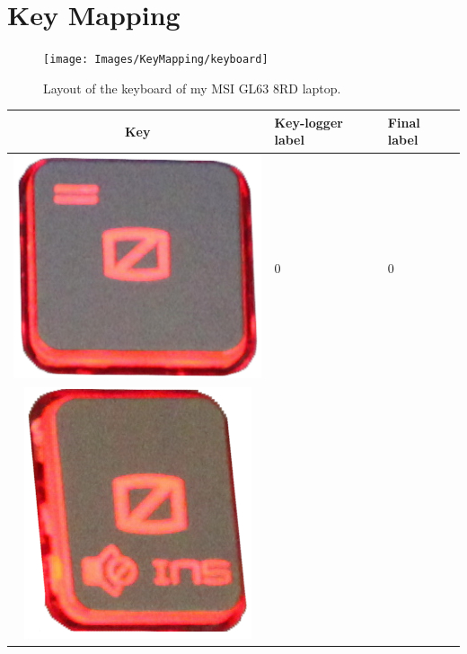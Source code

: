 \appendix
\chapter{Key Mapping}\label{appendix:KeyMapping}
\begin{figure}[h]
     \centering
     \texttt{[image: Images/KeyMapping/keyboard]}
     \caption{\footnotesize{Layout of the keyboard of my MSI GL63 8RD laptop.}}\label{keymapping:keyboard}
\end{figure}

\renewcommand{\arraystretch}{1.4}
\footnotesize
\vspace{0.5cm}
\begin{longtable}{|cll|}
\hline
\textbf{Key} & \textbf{Key-logger label} & \textbf{Final label}\\
\hline
\begin{minipage}[c]{.4\textwidth}
\vspace{0.2cm}
\includegraphics[scale=0.08]{Images/KeyMapping/0}
\vspace{0.2cm}
\end{minipage} & 0 & 0 \\
\hline
\multirow{2}{*}{
\begin{minipage}[c]{.4\textwidth}
\vspace{0.2cm}
\includegraphics[scale=0.08]{Images/KeyMapping/0_INSERT}

\end{minipage}}
\end{longtable}
